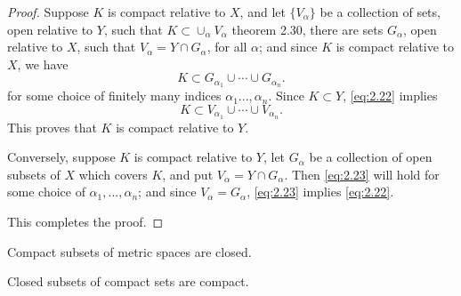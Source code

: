 \begin{proof}
    Suppose $K$ is compact relative to $X$, and let $\{V_\alpha\}$ be a collection of sets, open relative to $Y$, such that $K \subset \cup_\alpha V_\alpha$ theorem 2.30, there are sets $G_\alpha$, open relative to $X$, such that $V_\alpha = Y \cap G_\alpha$, for all $\alpha$; and since $K$ is compact relative to $X$, we have
    \begin{equation}\label{eq:2.22}
        K \subset G_{\alpha_{1}} \cup \cdots \cup G_{\alpha_{n}}.
    \end{equation}
    for some choice of finitely many indices $\alpha_1 ..., \alpha_n$. Since $K \subset Y$, \ref{eq:2.22} implies
    \begin{equation}\label{eq:2.23}
        K \subset V_{\alpha_{1}} \cup \cdots \cup V_{\alpha_{n}}.
    \end{equation}
    This proves that $K$ is compact relative to $Y$.
    
    Conversely, suppose $K$ is compact relative to $Y$, let $G_\alpha$ be a collection of open subsets of $X$ which covers $K$, and put $V_\alpha = Y \cap G_\alpha$. Then \ref{eq:2.23} will hold for some choice of $\alpha_1, ...,\alpha_n$; and since $V_\alpha = G_\alpha$, \ref{eq:2.23} implies \ref{eq:2.22}.
    
    This completes the proof.
\end{proof}

\begin{thm}
    \label{thm:2.34}
    Compact subsets of metric spaces are closed.
\end{thm}





\begin{thm}\label{thm:2.34 compact-close}
    Closed subsets of compact sets are compact.
\end{thm}

